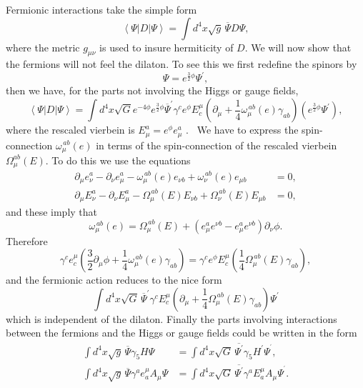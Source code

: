 \documentclass[12pt]{article}%
\begin{document}
Fermionic interactions take the simple form
\[
\left\langle \Psi\left\vert D\right\vert \Psi\right\rangle =\int d^{4}%
x\sqrt{g}\,\overline{\Psi}D\Psi,
\]
where the metric $g_{\mu\nu}$ is used to insure hermiticity of $D$. We will
now show that the fermions will not feel the dilaton. To see this we first
redefine the spinors by
\[
\Psi=e^{\frac{3}{2}\phi}\Psi^{\prime},
\]
then we have, for the parts not involving the Higgs or gauge fields,
\[
\left\langle \Psi\left\vert D\right\vert \Psi\right\rangle =\int d^{4}%
x\sqrt{G}e^{-4\phi}e^{\frac{3}{2}\phi}\overline{\Psi}^{\prime}\gamma
^{c}e^{\phi}E_{c}^{\mu}\left(  \partial_{\mu}+\frac{1}{4}\omega_{\mu}%
^{\,ab}\left(  e\right)  \gamma_{ab}\right)  \left(  e^{\frac{3}{2}\phi}%
\Psi^{\prime}\right)  ,
\]
where the rescaled vierbein is $E_{\mu}^{a}=e^{\phi}e_{\mu}^{a}$ . \ We have
to express the spin-connection $\omega_{\mu}^{\,ab}\left(  e\right)  $ in
terms of the spin-connection of the rescaled vierbein $\Omega_{\mu}%
^{ab}\left(  E\right)  .$ To do this we use the equations
\begin{align*}
\partial_{\mu}e_{\nu}^{a}-\partial_{\nu}e_{\mu}^{a}-\omega_{\mu}^{\,ab}\left(
e\right)  e_{\nu b}+\omega_{\nu}^{\,ab}\left(  e\right)  e_{\mu b}  &  =0,\\
\partial_{\mu}E_{\nu}^{a}-\partial_{\nu}E_{\mu}^{a}-\Omega_{\mu}^{\,ab}\left(
E\right)  E_{\nu b}+\Omega_{\nu}^{\,ab}\left(  E\right)  E_{\mu b}  &  =0,
\end{align*}
and these imply that
\[
\omega_{\mu}^{\,ab}\left(  e\right)  =\Omega_{\mu}^{\,ab}\left(  E\right)
+\left(  e_{\mu}^{a}e^{\nu b}-e_{\mu}^{a}e^{\nu b}\right)  \partial_{\nu}%
\phi.
\]
Therefore
\[
\gamma^{c}e_{c}^{\mu}\left(  \frac{3}{2}\partial_{\mu}\phi+\frac{1}{4}%
\omega_{\mu}^{\,ab}\left(  e\right)  \gamma_{ab}\right)  =\gamma^{c}e^{\phi
}E_{c}^{\mu}\left(  \frac{1}{4}\Omega_{\mu}^{\,ab}\left(  E\right)
\gamma_{ab}\right)  ,
\]
and the fermionic action reduces to the nice form
\[
\int d^{4}x\sqrt{G}\,\overline{\Psi}^{\prime}\gamma^{c}E_{c}^{\mu}\left(
\partial_{\mu}+\frac{1}{4}\Omega_{\mu}^{\,ab}\left(  E\right)  \gamma
_{ab}\right)  \Psi^{\prime}%
\]
which is independent of the dilaton. Finally the parts involving interactions
between the fermions and the Higgs or gauge fields could be written in the
form
\begin{align*}%
{\displaystyle\int}
d^{4}x\sqrt{g}\,\overline{\Psi}\gamma_{5}H\Psi &  =%
{\displaystyle\int}
d^{4}x\sqrt{G}\,\overline{\Psi^{\prime}}\gamma_{5}H^{\prime}\Psi^{^{\prime}%
},\\%
{\displaystyle\int}
d^{4}x\sqrt{g}\,\overline{\Psi}\gamma^{a}e_{a}^{\mu}A_{\mu}\Psi &  =%
{\displaystyle\int}
d^{4}x\sqrt{G}\,\overline{\Psi^{\prime}}\gamma^{a}E_{a}^{\mu}A_{\mu}%
\Psi^{^{\prime}}.
\end{align*}
\end{document}
